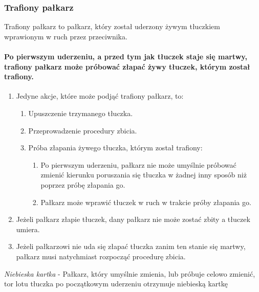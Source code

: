 \documentclass[12pt]{article}
\begin{document}
\subsubsection{Trafiony pałkarz}

Trafiony pałkarz to pałkarz, który został uderzony żywym tłuczkiem
wprawionym w ruch przez przeciwnika.

\paragraph{Po pierwszym uderzeniu, a przed tym jak tłuczek staje
	się martwy, trafiony pałkarz może próbować złapać żywy tłuczek, którym
	został trafiony.}

\begin{enumerate}
	\item
	      Jedyne akcje, które może podjąć trafiony pałkarz, to:

	      \begin{enumerate}
		      \item
		            Upuszczenie trzymanego tłuczka.
		      \item
		            Przeprowadzenie procedury zbicia.
		      \item
		            Próba złapania żywego tłuczka, którym został trafiony:

		            \begin{enumerate}
			            \item
			                  Po pierwszym uderzeniu, pałkarz nie może umyślnie próbować zmienić
			                  kierunku poruszania się tłuczka w żadnej inny sposób niż poprzez
			                  próbę złapania go.
			            \item
			                  Pałkarz może wprawić tłuczek w ruch w trakcie próby złapania go.
		            \end{enumerate}
	      \end{enumerate}
	\item
	      Jeżeli pałkarz złapie tłuczek, dany pałkarz nie może zostać zbity a
	      tłuczek umiera.
	\item
	      Jeżeli pałkarzowi nie uda się złapać tłuczka zanim ten stanie się
	      martwy, pałkarz musi natychmiast rozpocząć procedurę zbicia.
\end{enumerate}

\emph{Niebieska kartka} - Pałkarz, który umyślnie zmienia, lub próbuje
celowo zmienić, tor lotu tłuczka po początkowym uderzeniu otrzymuje
niebieską kartkę
\end{document}
